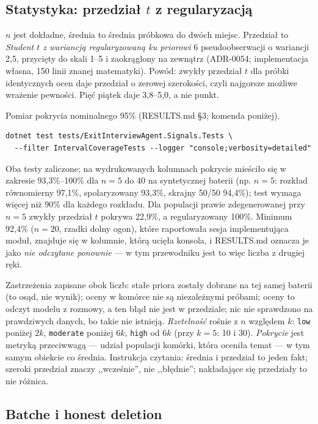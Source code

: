 \subsection{\texorpdfstring{Statystyka: przedział $t$ z regularyzacją}{Statystyka: przedział t z regularyzacją}}

$n$ jest dokładne, średnia to średnia próbkowa do dwóch miejsc. Przedział to
\emph{Student $t$ z wariancją regularyzowaną ku priorowi} 6 pseudoobserwacji o
wariancji 2,5, przycięty do skali 1--5 i zaokrąglony na zewnątrz (ADR-0054;
implementacja własna, 150 linii znanej matematyki). Powód: zwykły przedział $t$
dla próbki identycznych ocen daje przedział o zerowej szerokości, czyli
najgorsze możliwe wrażenie pewności. Pięć piątek daje 3,8--5,0, a nie punkt.

Pomiar pokrycia nominalnego 95\% (RESULTS.md §3; komenda poniżej).
\begin{Verbatim}[fontsize=\small]
dotnet test tests/ExitInterviewAgent.Signals.Tests \
  --filter IntervalCoverageTests --logger "console;verbosity=detailed"
\end{Verbatim}
Oba testy zaliczone; na wydrukowanych kolumnach pokrycie mieściło się w zakresie
93,3\%--100\% dla $n=5$ do 40 na syntetycznej baterii (np. $n=5$: rozkład
równomierny 97,1\%, spolaryzowany 93,3\%, skrajny 50/50 94,4\%); test wymaga
więcej niż 90\% dla każdego rozkładu. Dla populacji prawie zdegenerowanej przy
$n=5$ zwykły przedział $t$ pokrywa 22,9\%, a regularyzowany 100\%. Minimum 92,4\%
($n=20$, rzadki dolny ogon), które raportowała sesja implementująca moduł,
znajduje się w kolumnie, którą ucięła konsola, i RESULTS.md oznacza je jako
\emph{nie odczytane ponownie} --- w tym przewodniku jest to więc liczba z drugiej ręki.

Zastrzeżenia zapisane obok liczb: stałe priora zostały dobrane na tej samej baterii
(to osąd, nie wynik); oceny w komórce nie są niezależnymi próbami; oceny to
odczyt modelu z rozmowy, a ten błąd nie jest w przedziale; nic nie sprawdzono na
prawdziwych danych, bo takie nie istnieją. \emph{Rzetelność} rośnie z $n$ względem
$k$: \texttt{low} poniżej $2k$, \texttt{moderate} poniżej $6k$, \texttt{high} od
$6k$ (przy $k=5$: 10 i 30). \emph{Pokrycie} jest metryką przeciwwagą --- udział
populacji komórki, która oceniła temat --- w tym samym obiekcie co średnia.
Instrukcja czytania: średnia i przedział to jeden fakt; szeroki przedział znaczy
,,wcześnie'', nie ,,błędnie''; nakładające się przedziały to nie różnica.

\subsection{Batche i honest deletion}

